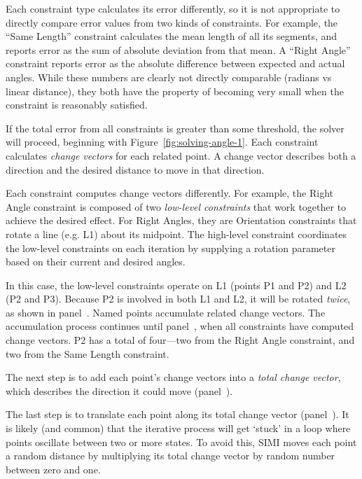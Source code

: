 Each constraint type calculates its error differently, so it is not
appropriate to directly compare error values from two kinds of
constraints. For example, the ``Same Length'' constraint calculates
the mean length of all its segments, and reports error as the sum of
absolute deviation from that mean. A ``Right Angle'' constraint
reports error as the absolute difference between expected and actual
angles. While these numbers are clearly not directly comparable
(radians vs linear distance), they both have the property of becoming
very small when the constraint is reasonably satisfied.



If the total error from all constraints is greater than some
threshold, the solver will proceed, beginning with
Figure~\ref{fig:solving-angle-1}. Each constraint calculates
\textit{change vectors} for each related point. A change vector
describes both a direction and the desired distance to move in that
direction. 

Each constraint computes change vectors differently. For example, the
Right Angle constraint is composed of two \textit{low-level
  constraints} that work together to achieve the desired effect. For
Right Angles, they are Orientation constraints that rotate a line
(e.g. L1) about its midpoint. The high-level constraint coordinates
the low-level constraints on each iteration by supplying a rotation
parameter based on their current and desired angles.

In this case, the low-level constraints operate on L1 (points P1 and
P2) and L2 (P2 and P3). Because P2 is involved in both L1 and L2, it
will be rotated \textit{twice}, as shown in
panel~\textit{}. Named points accumulate
related change vectors. The accumulation process continues until
panel~\textit{}, when all constraints have
computed change vectors. P2 has a total of four---two from the Right
Angle constraint, and two from the Same Length constraint.

The next step is to add each point's change vectors into a
\textit{total change vector}, which describes the direction it could
move (panel~\textit{}).

The last step is to translate each point along its total change vector
(panel~\textit{}). It is likely (and
common) that the iterative process will get `stuck' in a loop where
points oscillate between two or more states. To avoid this, SIMI moves
each point a random distance by multiplying its total change vector by
random number between zero and one.

